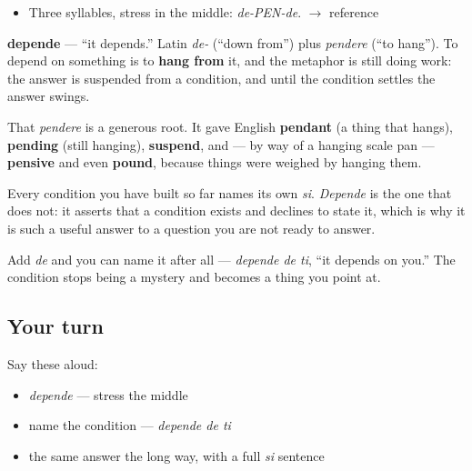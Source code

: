\begin{sounds}
\begin{itemize}
\raggedright
  \item Three syllables, stress in the middle: \emph{de-PEN-de}. $\to$ reference
\end{itemize}
\end{sounds}

\begin{cousinweb}
\textbf{depende} — \textquotedblleft{}it depends.\textquotedblright{} Latin \emph{de-} (\textquotedblleft{}down from\textquotedblright{}) plus \emph{pendere} (\textquotedblleft{}to hang\textquotedblright{}). To depend on something is to \textbf{hang from} it, and the metaphor is still doing work: the answer is suspended from a condition, and until the condition settles the answer swings.

That \emph{pendere} is a generous root. It gave English \textbf{pendant} (a thing that hangs), \textbf{pending} (still hanging), \textbf{suspend}, and — by way of a hanging scale pan — \textbf{pensive} and even \textbf{pound}, because things were weighed by hanging them.
\end{cousinweb}

\begin{grammarlens}[title={What you've built}]
Every condition you have built so far names its own \emph{si}. \emph{Depende} is the one that does not: it asserts that a condition exists and declines to state it, which is why it is such a useful answer to a question you are not ready to answer.

Add \emph{de} and you can name it after all — \emph{depende de ti}, \textquotedblleft{}it depends on you.\textquotedblright{} The condition stops being a mystery and becomes a thing you point at.
\end{grammarlens}

\subsection*{Your turn}
Say these aloud:

\begin{itemize}
\raggedright
  \item \emph{depende} — stress the middle
  \item name the condition — \emph{depende de ti}
  \item the same answer the long way, with a full \emph{si} sentence
\end{itemize}


